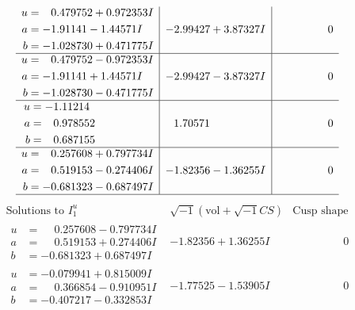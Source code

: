 \documentclass[1p]{elsarticle_modified}
\theoremstyle{definition}
\newcommand{\I}{\sqrt{-1}}
\begin{document}
$$\begin{array}{c|c|c}
\begin{aligned}
u &= \phantom{-}0.479752 + 0.972353 I \\
a &= -1.91141 - 1.44571 I \\
b &= -1.028730 + 0.471775 I\end{aligned}
 & -2.99427 + 3.87327 I & \phantom{-0.000000 } 0 \\ \hline\begin{aligned}
u &= \phantom{-}0.479752 - 0.972353 I \\
a &= -1.91141 + 1.44571 I \\
b &= -1.028730 - 0.471775 I\end{aligned}
 & -2.99427 - 3.87327 I & \phantom{-0.000000 } 0 \\ \hline\begin{aligned}
u &= -1.11214\phantom{ +0.000000I} \\
a &= \phantom{-}0.978552\phantom{ +0.000000I} \\
b &= \phantom{-}0.687155\phantom{ +0.000000I}\end{aligned}
 & \phantom{-}1.70571\phantom{ +0.000000I} & \phantom{-0.000000 } 0 \\ \hline\begin{aligned}
u &= \phantom{-}0.257608 + 0.797734 I \\
a &= \phantom{-}0.519153 - 0.274406 I \\
b &= -0.681323 - 0.687497 I\end{aligned}
 & -1.82356 - 1.36255 I & \phantom{-0.000000 } 0\\
 \hline 
 \end{array}$$\newpage$$\begin{array}{c|c|c}  
\text{Solutions to }I^u_{1}& \I (\text{vol} + \sqrt{-1}CS) & \text{Cusp shape}\\
 \hline 
\begin{aligned}
u &= \phantom{-}0.257608 - 0.797734 I \\
a &= \phantom{-}0.519153 + 0.274406 I \\
b &= -0.681323 + 0.687497 I\end{aligned}
 & -1.82356 + 1.36255 I & \phantom{-0.000000 } 0 \\ \hline\begin{aligned}
u &= -0.079941 + 0.815009 I \\
a &= \phantom{-}0.366854 - 0.910951 I \\
b &= -0.407217 - 0.332853 I\end{aligned}
 & -1.77525 - 1.53905 I & \phantom{-0.000000 } 0 \\ \hline\begin{aligned}

\end{aligned}
\end{array}$$
\end{document}
